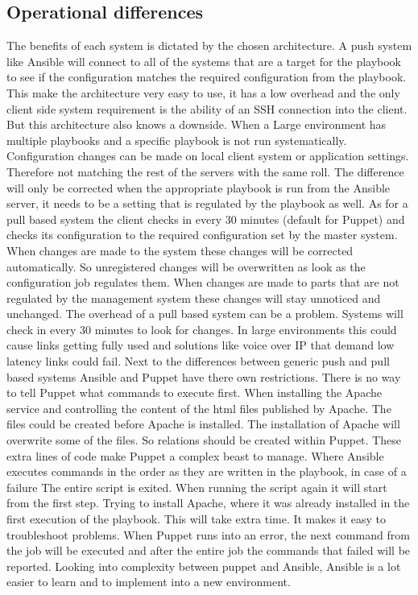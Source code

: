 \subsection{Operational differences}
The benefits of each system is dictated by the chosen architecture. A push system like Ansible will connect to all of the systems that are a target for the playbook to see if the configuration matches the required configuration from the playbook. This make the architecture very easy to use, it has a low overhead and the only client side system requirement is the ability of an SSH connection into the client. But this architecture also knows a downside. When a Large environment has multiple playbooks and a specific playbook is not run systematically. Configuration changes can be made on local client system or application settings. Therefore not matching the rest of the servers with the same roll. The difference will only be corrected when the appropriate playbook is run from the Ansible server, it needs to be a setting that is regulated by the playbook as well. As for a pull based system the client checks in every 30 minutes (default for Puppet) and checks its configuration to the required configuration set by the master system. When changes are made to the system these changes will be corrected automatically. So unregistered changes will be overwritten as look as the configuration job regulates them. When changes are made to parts that are not regulated by the management system these changes will stay unnoticed and unchanged. The overhead of a pull based system can be a problem. Systems will check in every 30 minutes to look for changes. In large environments this could cause links getting fully used and solutions like voice over IP that demand low latency links could fail. Next to the differences between generic push and pull based systems Ansible and Puppet have there own restrictions. There is no way to tell Puppet what commands to execute first. When installing the Apache service and controlling the content of the html files published by Apache. The files could be created before Apache is installed. The installation of Apache will overwrite some of the files. So relations should be created within Puppet. These extra lines of code make Puppet a complex beast to manage. Where Ansible executes commands in the order as they are written in the playbook, in case of a failure The entire script is exited. When running the script again it will start from the first step. Trying to install Apache, where it was already installed in the first execution of the playbook. This will take extra time. It makes it easy to troubleshoot problems. When Puppet runs into an error, the next command from the job will be executed and after the entire job the commands that failed will be reported. Looking into complexity between puppet and Ansible, Ansible is a lot easier to learn and to implement into a new environment.

